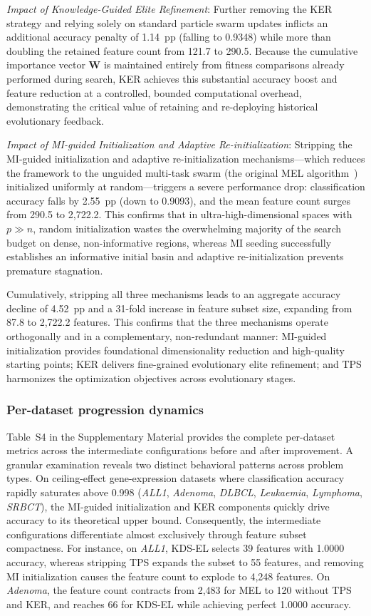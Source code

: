 \textit{Impact of Knowledge-Guided Elite Refinement}: Further removing the KER strategy and relying solely on standard particle swarm updates inflicts an additional accuracy penalty of 1.14~pp (falling to 0.9348) while more than doubling the retained feature count from 121.7 to 290.5. Because the cumulative importance vector $\mathbf{W}$ is maintained entirely from fitness comparisons already performed during search, KER achieves this substantial accuracy boost and feature reduction at a controlled, bounded computational overhead, demonstrating the critical value of retaining and re-deploying historical evolutionary feedback.

\textit{Impact of MI-guided Initialization and Adaptive Re-initialization}: Stripping the MI-guided initialization and adaptive re-initialization mechanisms---which reduces the framework to the unguided multi-task swarm (the original MEL algorithm~\cite{mel2024}) initialized uniformly at random---triggers a severe performance drop: classification accuracy falls by 2.55~pp (down to 0.9093), and the mean feature count surges from 290.5 to 2{,}722.2. This confirms that in ultra-high-dimensional spaces with $p \gg n$, random initialization wastes the overwhelming majority of the search budget on dense, non-informative regions, whereas MI seeding successfully establishes an informative initial basin and adaptive re-initialization prevents premature stagnation.

Cumulatively, stripping all three mechanisms leads to an aggregate accuracy decline of 4.52~pp and a 31-fold increase in feature subset size, expanding from 87.8 to 2{,}722.2 features. This confirms that the three mechanisms operate orthogonally and in a complementary, non-redundant manner: MI-guided initialization provides foundational dimensionality reduction and high-quality starting points; KER delivers fine-grained evolutionary elite refinement; and TPS harmonizes the optimization objectives across evolutionary stages.

\subsubsection{Per-dataset progression dynamics}

Table~S4 in the Supplementary Material provides the complete per-dataset metrics across the intermediate configurations before and after improvement. A granular examination reveals two distinct behavioral patterns across problem types. On ceiling-effect gene-expression datasets where classification accuracy rapidly saturates above 0.998 (\textit{ALL1}, \textit{Adenoma}, \textit{DLBCL}, \textit{Leukaemia}, \textit{Lymphoma}, \textit{SRBCT}), the MI-guided initialization and KER components quickly drive accuracy to its theoretical upper bound. Consequently, the intermediate configurations differentiate almost exclusively through feature subset compactness. For instance, on \textit{ALL1}, KDS-EL selects 39 features with 1.0000 accuracy, whereas stripping TPS expands the subset to 55 features, and removing MI initialization causes the feature count to explode to 4{,}248 features. On \textit{Adenoma}, the feature count contracts from 2{,}483 for MEL to 120 without TPS and KER, and reaches 66 for KDS-EL while achieving perfect 1.0000 accuracy.

